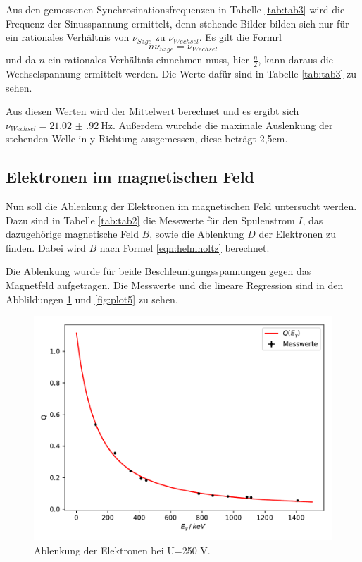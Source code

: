 Aus den gemessenen Synchrosinationsfrequenzen in Tabelle \ref{tab:tab3} wird die Frequenz der
Sinusspannung ermittelt, denn stehende Bilder bilden sich nur für ein rationales Verhältnis
von $\nu_{Säge}$ zu $\nu_{Wechsel}$.
Es gilt die Formrl
\begin{equation}
  n\nu_{Säge}=\nu_{Wechsel}
\end{equation}
und da $n$ ein rationales Verhältnis einnehmen muss, hier $\frac{n}{2}$,
kann daraus die Wechselspannung ermittelt werden. Die Werte dafür sind in Tabelle
\ref{tab:tab3} zu sehen.


Aus diesen Werten wird der Mittelwert berechnet und es ergibt sich
$\nu_{Wechsel}=\SI{21.02(92)}{\Hz}$.
Außerdem wurchde die maximale Auslenkung der stehenden Welle in y-Richtung ausgemessen, diese
beträgt 2,5\;cm.



\subsection{Elektronen im magnetischen Feld}

Nun soll die Ablenkung der Elektronen im magnetischen Feld untersucht werden.
Dazu sind in Tabelle \ref{tab:tab2} die Messwerte für den Spulenstrom $I$, das
dazugehörige magnetische Feld $B$, sowie die Ablenkung $D$ der Elektronen zu finden.
Dabei wird $B$ nach Formel \ref{eqn:helmholtz} berechnet.



Die Ablenkung wurde für beide Beschleunigungsspannungen gegen das Magnetfeld aufgetragen.
Die Messwerte und die lineare Regression sind in den Abblildungen \ref{fig:plot4} und
\ref{fig:plot5} zu sehen.

\begin{figure}
  \centering
  \includegraphics{plot4.pdf}
  \caption{Ablenkung der Elektronen bei U=250\; V.}
  \label{fig:plot4}
\end{figure}

